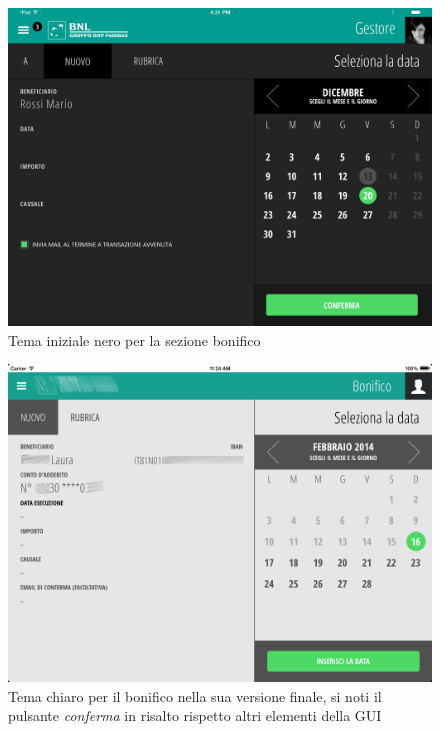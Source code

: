 \begin{figure}[!htbp]
\centering
\includegraphics[scale=0.30]{ux/bonificonero.png}
\caption{Tema iniziale nero per la sezione bonifico}
\end{figure}

\begin{figure}[!htbp]
\centering
\includegraphics[scale=0.30]{ux/bonificogrigio.png}
\caption{Tema chiaro per il bonifico nella sua versione finale, si noti il pulsante \emph{conferma} in risalto rispetto altri elementi della GUI}
\end{figure}

